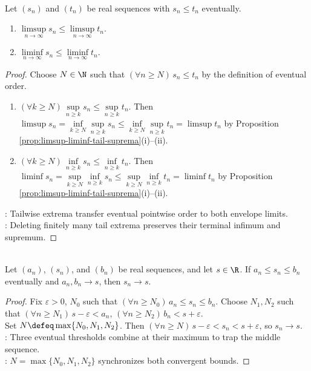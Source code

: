 \begin{theorem} \label{thm:limsup-liminf-order-comparison} \\
Let $(s_n)$ and $(t_n)$ be real sequences with $s_n\leq t_n$ eventually.
\begin{enumerate}[label=(\roman*)]
\setlength{\itemsep}{0pt}
\item $\limsup\limits_{n\to\infty}s_n\leq \limsup\limits_{n\to\infty}t_n$.
\item $\liminf\limits_{n\to\infty}s_n\leq \liminf\limits_{n\to\infty}t_n$.
\end{enumerate}
\begin{proof}
Choose $N\in\N$ such that $(\forall n\geq N)\,s_n\leq t_n$ by the definition of eventual order.
\begin{enumerate}[label=(\roman*)]
\setlength{\itemsep}{0pt}
\item $(\forall k\geq N)\,\sup\limits_{n\geq k}s_n\leq\sup\limits_{n\geq k}t_n$. Then $\limsup s_n=\inf\limits_{k\geq N}\sup\limits_{n\geq k}s_n\leq\inf\limits_{k\geq N}\sup\limits_{n\geq k}t_n=\limsup t_n$ by Proposition \ref{prop:limsup-liminf-tail-suprema}(i)--(ii).
\item $(\forall k\geq N)\,\inf\limits_{n\geq k}s_n\leq\inf\limits_{n\geq k}t_n$. Then $\liminf s_n=\sup\limits_{k\geq N}\inf\limits_{n\geq k}s_n\leq\sup\limits_{k\geq N}\inf\limits_{n\geq k}t_n=\liminf t_n$ by Proposition \ref{prop:limsup-liminf-tail-suprema}(i)--(ii).
\end{enumerate}
: Tailwise extrema transfer eventual pointwise order to both envelope limits.\\
: Deleting finitely many tail extrema preserves their terminal infimum and supremum.
\end{proof}
\end{theorem}

\begin{theorem} \label{thm:pinching-theorem-sequences} \\
Let $(a_n)$, $(s_n)$, and $(b_n)$ be real sequences, and let $s\in\R$. If $a_n\leq s_n\leq b_n$ eventually and $a_n,b_n\to s$, then $s_n\to s$.
\begin{proof}
Fix $\varepsilon>0$, $N_0$ such that $(\forall n\geq N_0)\,a_n\leq s_n\leq b_n$. Choose $N_1,N_2$ such that $(\forall n\geq N_1)\,s-\varepsilon<a_n$, $(\forall n\geq N_2)\,b_n<s+\varepsilon$.\\
Set $N\defeq\max\{N_0,N_1,N_2\}$. Then $(\forall n\geq N)\,s-\varepsilon<s_n<s+\varepsilon$, so $s_n\to s$.\\
: Three eventual thresholds combine at their maximum to trap the middle sequence.\\
: $N=\max\{N_0,N_1,N_2\}$ synchronizes both convergent bounds.
\end{proof}
\end{theorem}

